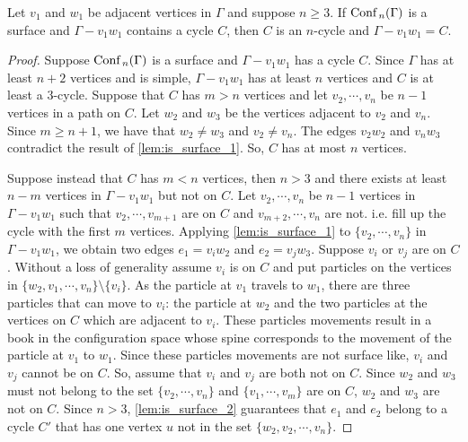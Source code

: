 \begin{lem}
Let \(v_1\) and \(w_1\) be adjacent vertices in \(\Gamma\) and suppose \(n \ge 3\).
If \(\text{Conf}\,_n(\Gamma)\) is a surface and \(\Gamma - v_1 w_1\) contains a cycle \(C\),
then \(C\) is an \(n\)-cycle and \(\Gamma - v_1 w_1 = C\). 
\end{lem}
\begin{proof}
Suppose \(\text{Conf}\,_n(\Gamma)\) is a surface and \(\Gamma - v_1 w_1\) has a cycle \(C\).
Since \(\Gamma\) has at least \(n + 2\) vertices and is simple, 
\(\Gamma - v_1 w_1\) has at least \(n\) vertices and \(C\) is at least a \(3\)-cycle.
Suppose that \(C\) has \(m > n\) vertices and let \(v_2, \cdots, v_n\) be \(n-1\) vertices in a path on \(C\).
Let \(w_2\) and \(w_3\) be the vertices adjacent to \(v_2\) and \(v_n\).
Since \(m \ge n + 1\), we have that \(w_2 \neq w_3\) and \(v_2 \neq v_n\).
The edges \(v_2 w_2\) and \(v_n w_3\) contradict the result of \ref{lem:is_surface_1}.
So, \(C\) has at most \(n\) vertices.

Suppose instead that \(C\) has \(m < n\) vertices, then \(n > 3\) and there exists at least \(n - m\) vertices in \(\Gamma - v_1 w_1\) but not on \(C\).
Let \(v_2, \cdots, v_n\) be \(n - 1\) vertices in \(\Gamma - v_1 w_1\) such that \(v_2, \cdots, v_{m + 1}\) are on \(C\) and
\(v_{m + 2}, \cdots, v_n\) are not. i.e. fill up the cycle with the first \(m\) vertices.
Applying \ref{lem:is_surface_1} to \(\{v_2, \cdots, v_n\}\) in \(\Gamma - v_1 w_1\), we obtain two edges \(e_1 = v_i w_2\) and \(e_2 = v_j w_3\).
Suppose \(v_i\) or \(v_j\) are on \(C\). Without a loss of generality assume \(v_i\) is on \(C\) and
put particles on the vertices in \(\{w_2, v_1, \cdots, v_n\}\setminus\{v_i\}\).
As the particle at \(v_1\) travels to \(w_1\), there are three particles that can move to \(v_i\): the particle at \(w_2\) and the two
particles at the vertices on \(C\) which are adjacent to \(v_i\).
These particles movements result in a book in the configuration space whose spine corresponds to the movement of the particle at \(v_1\) to \(w_1\).
Since these particles movements are not surface like, \(v_i\) and \(v_j\) cannot be on \(C\).
So, assume that \(v_i\) and \(v_j\) are both not on \(C\).
Since \(w_2\) and \(w_3\) must not belong to the set \(\{v_2, \cdots, v_n\}\) and \(\{v_1, \cdots, v_m\}\) are on \(C\),
\(w_2\) and \(w_3\) are not on \(C\).
Since \(n > 3\), \ref{lem:is_surface_2} guarantees that \(e_1\) and \(e_2\) belong to a cycle \(C'\) that has one vertex \(u\) not in
the set \(\{w_2, v_2, \cdots, v_n\}\).


\end{proof}
